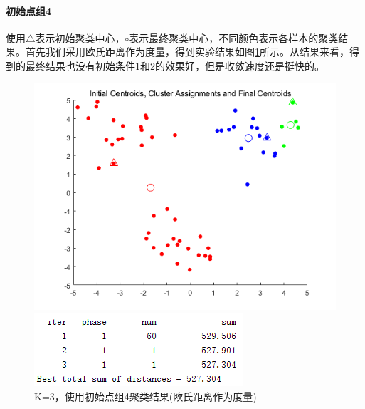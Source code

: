 \documentclass[cn]{elegantbook}
\begin{document}
\paragraph{初始点组4}
使用$\triangle$表示初始聚类中心，$\circ$表示最终聚类中心，不同颜色表示各样本的聚类结果。首先我们采用欧氏距离作为度量，得到实验结果如图\ref{res34}所示。从结果来看，得到的最终结果也没有初始条件1和2的效果好，但是收敛速度还是挺快的。
\begin{figure}[!h]
	\centering
	\begin{minipage}{0.48\linewidth}
		\centering
		\includegraphics[width=\linewidth]{images/res34}
	\end{minipage}
	\begin{minipage}{0.48\linewidth}
		\centering
		\includegraphics[width=\linewidth]{images/res341}
	\end{minipage}
	\caption{\label{res34}K=3，使用初始点组4聚类结果(欧氏距离作为度量)}
\end{figure}
\end{document}
